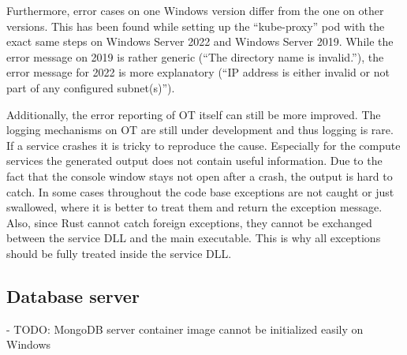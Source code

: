 Furthermore, error cases on one \ac{Windows} version differ from the one on other versions. This has been found while setting up the \enquote{kube-proxy} pod with the exact same steps on Windows Server 2022 and Windows Server 2019. While the error message on 2019 is rather generic (\enquote{The directory name is invalid.}), the error message for 2022 is more explanatory (\enquote{IP address is either invalid or not part of any configured subnet(s)}).

Additionally, the error reporting of \ac{OT} itself can still be more improved. The logging mechanisms on \ac{OT} are still under development and thus logging is rare. If a service crashes it is tricky to reproduce the cause. Especially for the compute services the generated output does not contain useful information. Due to the fact that the console window stays not open after a crash, the output is hard to catch.
In some cases throughout the code base exceptions are not caught or just swallowed, where it is better to treat them and return the exception message.
Also, since Rust cannot catch foreign exceptions, they cannot be exchanged between the service \ac{DLL} and the main executable. This is why all exceptions should be fully treated inside the service \ac{DLL}. 


\subsection{Database server}

- TODO: MongoDB server container image cannot be initialized easily on Windows



